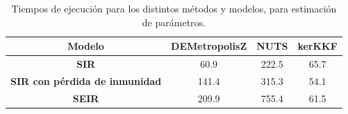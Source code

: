 \begin{table}[h!]
    \centering
    \caption{Tiempos de ejecución para los distintos métodos y modelos, para estimación de parámetros.} 
    \begin{tabular}{|c|c|c|c|}
    \hline
    \textbf{Modelo} & \textbf{DEMetropolisZ} & \textbf{NUTS} & \textbf{kerKKF}  \\ \hline
    \textbf{SIR} & 60.9 & 222.5 & 65.7 \\ \hline
    \textbf{SIR con pérdida de inmunidad} & 141.4 & 315.3 & 54.1 \\ \hline
    \textbf{SEIR} & 209.9 & 755.4 & 61.5 \\ \hline
    \end{tabular}
    \label{tab:ex_times}
\end{table}